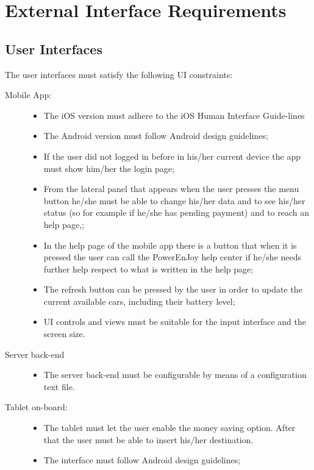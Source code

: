 \section{External Interface Requirements}

\subsection{User Interfaces}
The user interfaces must satisfy the following UI constraints:
\begin{description}
\item[Mobile App:]
	\begin{itemize}
	\item The iOS version must adhere to the iOS Human Interface Guide-lines
	\item The Android version must follow Android design guidelines;
	\item If the user did not logged in before in his/her current device the app must show him/her the login page;
	\item From the lateral panel that appears when the user presses the menu button he/she must be able to change his/her data and to see his/her status (so for example if he/she has pending payment) and to reach an help page,;
	\item In the help page of the mobile app there is a button that when it is pressed the user can call the PowerEnJoy help center if he/she needs further help respect to what is written in the help page;
	\item The refresh button can be pressed by the user in order to update the current available cars, including their battery level;
	\item UI controls and views must be suitable for the input interface and the screen size.
	\end{itemize}
\item[Server back-end]
	\begin{itemize}
	\item The server back-end must be configurable by means of a configuration text file.
	\end{itemize}
\item[Tablet on-board:]
	\begin{itemize}
	\item The tablet must let the user enable the money saving option. After that the user must be able to insert his/her destination.
	\item The interface must follow Android design guidelines;

\end{itemize}
\end{description}
